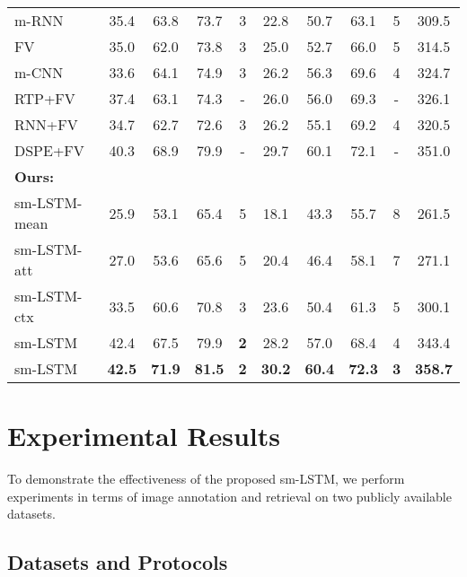 \documentclass[10pt,twocolumn,letterpaper]{article}
\begin{document}
\begin{table*}[t]
\begin{tabular}{l|cccc|cccc|c}
m-RNN \cite{mao2014explain}       &35.4 &63.8 &73.7 &{3} &22.8 &50.7 &63.1 &{5} & 309.5\\
FV \cite{klein2015associating} &35.0 &62.0 &73.8 &{3} &25.0 &52.7 &66.0 &{5} & 314.5\\
m-CNN \cite{ma2015multimodal}          &33.6 &{64.1} &{74.9} &{3} &{26.2} &{56.3} &{69.6} &{4} & 324.7\\
RTP+FV  \cite{plummer2015flickr30k} &{37.4} &63.1 &74.3 &- &26.0 &{56.0} &{69.3} &- & 326.1\\
RNN+FV \cite{lev2015rnn}          &34.7 &62.7 &72.6 &{3} &{26.2} &55.1 &69.2 &{4} & 320.5\\
DSPE+FV \cite{wang2015learning}       &40.3 &68.9 &79.9 &- &29.7 &60.1 &72.1 &- & 351.0\\
\hline
\bf{Ours}:      & & & & & & & &\\
\hspace{0mm} sm-LSTM-mean                &25.9 &53.1 &65.4 &5 &18.1 &43.3 &55.7 &8 & 261.5\\
\hspace{0mm} sm-LSTM-att                &27.0 &53.6 &65.6 &5 &20.4 &46.4 &58.1 &7 & 271.1\\
\hspace{0mm} sm-LSTM-ctx                 &33.5 &60.6 &70.8 &3 &23.6 &50.4 &61.3 &5 &300.1\\
\hspace{0mm} sm-LSTM                  &42.4 &67.5 &79.9 &\bf{2} &28.2 &57.0 &68.4 &4 &343.4 \\
\hspace{0mm} sm-LSTM                 &\bf{42.5} &\bf{71.9} &\bf{81.5} &\bf{2} &\bf{30.2} &\bf{60.4} &\bf{72.3} &\bf{3} & \bf{358.7}\\




\hline
\hline
\end{tabular}

\label{table:f30k}
\end{table*}


\section{Experimental Results}
To demonstrate the effectiveness of the proposed sm-LSTM,
we perform experiments in terms of image annotation
and retrieval on two publicly available datasets.

\subsection{Datasets and Protocols}
\end{document}
